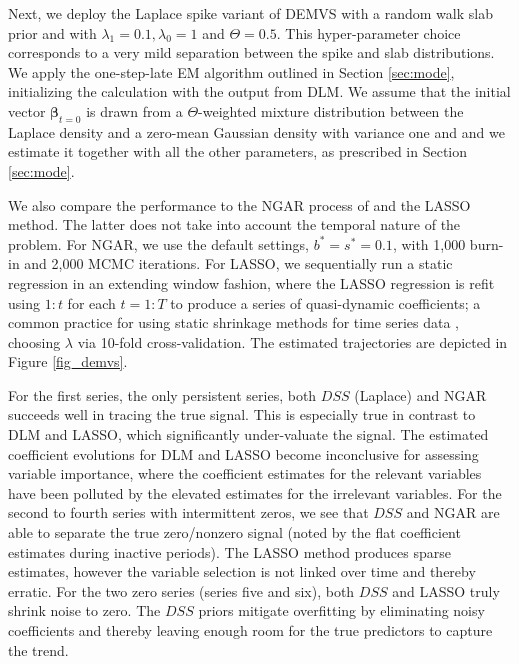 \documentclass[ba]{imsart}
\numberwithin{equation}{section}
\theoremstyle{plain}
\def\b{\mbox{\boldmath$b$}}
\newcommand{\bm}[1]{\boldsymbol{#1}}
\def\b{\bm{\beta}}
\begin{document}
{						
						

Next, we deploy the Laplace spike variant of DEMVS with a random walk  slab prior and with $\lambda_1=0.1,\lambda_0=1$ and $\Theta=0.5$. %
 This hyper-parameter choice corresponds to a very mild separation between the  spike and slab distributions.
 We apply the one-step-late EM algorithm outlined in Section \ref{sec:mode}, initializing the calculation with the output from DLM. We assume that the initial vector $\b_{t=0}$ is drawn from a $\Theta$-weighted mixture distribution between the Laplace density and a zero-mean Gaussian density with variance one and  and we estimate it together with all the other parameters, as prescribed in Section \ref{sec:mode}. 
 
 
 
We also compare the performance to the NGAR process of \cite{kalli_griffin} and the LASSO method. {The latter} does not take into account the temporal nature of the problem.
For NGAR, we use the default settings, $b^*=s^*=0.1$, with 1,000 burn-in and 2,000 MCMC iterations.
For LASSO, we sequentially run a static regression in an extending window fashion, {where the LASSO regression is refit using $1{:}t$ for each $t=1{:}T$ to produce a series of quasi-dynamic coefficients; a common practice for using static shrinkage methods for time series data \citep{bai2008forecasting,de2008forecasting,stock2012generalized,li2014forecasting}}, choosing $\lambda$ via 10-fold cross-validation. The estimated trajectories are depicted in Figure \ref{fig_demvs}.





For the first series, the only persistent series,  both $DSS$ (Laplace) and NGAR  succeeds well in tracing the true signal.
This is especially true in contrast to DLM and LASSO, which significantly under-valuate the signal. 
The estimated coefficient evolutions for DLM and LASSO become inconclusive for assessing variable importance,  where the coefficient estimates for the relevant variables have been polluted by the elevated estimates for the irrelevant variables. For the second to fourth series with intermittent zeros, we see that $DSS$ and NGAR are able to separate the true zero/nonzero signal (noted by the flat coefficient estimates during inactive periods). 
The LASSO method produces sparse estimates, however the variable selection is not linked over time and thereby erratic.
For the two zero series (series five and six), both $DSS$ and LASSO truly shrink noise to zero.
The $DSS$ priors mitigate overfitting by eliminating noisy coefficients and thereby leaving enough room for the true predictors to capture the trend.  
 



}
\end{document}
